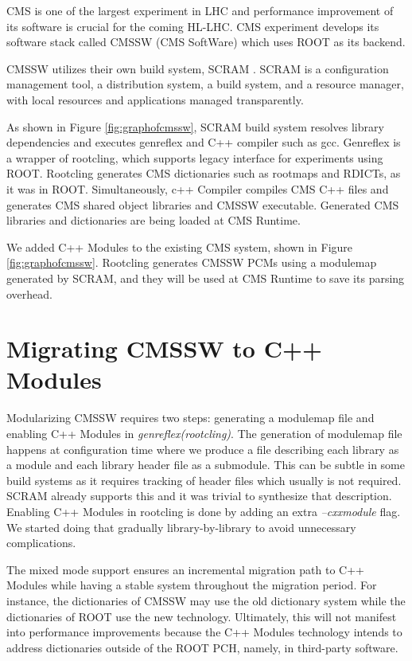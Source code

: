 \documentclass[12pt]{iopart}
\begin{document}
CMS \cite{cms} is one of the largest experiment in LHC and performance improvement of its software is crucial for the coming HL-LHC. CMS experiment develops its software stack called CMSSW (CMS SoftWare) which uses ROOT as its backend.

CMSSW utilizes their own build system, SCRAM \cite{scram}. SCRAM is a configuration management tool, a distribution system, a build system, and a resource manager, with local resources and applications managed transparently.

As shown in Figure \ref{fig:graphofcmssw}, SCRAM build system resolves library dependencies and executes genreflex and C++ compiler such as gcc. Genreflex is a wrapper of rootcling, which supports legacy interface for experiments using ROOT. Rootcling generates CMS dictionaries such as rootmaps and RDICTs, as it was in ROOT. Simultaneously, c++ Compiler compiles CMS C++ files and generates CMS shared object libraries and CMSSW executable. Generated CMS libraries and dictionaries are being loaded at CMS Runtime.

We added C++ Modules to the existing CMS system, shown in Figure \ref{fig:graphofcmssw}. Rootcling generates CMSSW PCMs using a modulemap generated by SCRAM, and they will be used at CMS Runtime to save its parsing overhead.

\section{Migrating CMSSW to C++ Modules}
\label{migration}
Modularizing CMSSW requires two steps: generating a modulemap file and enabling C++ Modules in \textit{genreflex(rootcling)}. The generation of modulemap file happens at configuration time where we produce a file describing each library as a module and each library header file as a submodule. This can be subtle in some build systems as it requires tracking of header files which usually is not required. SCRAM already supports this and it was trivial to synthesize that description. Enabling C++ Modules in rootcling is done by adding an extra \textit{--cxxmodule} flag. We started doing that gradually library-by-library to avoid unnecessary complications.

The mixed mode support ensures an incremental migration path to C++ Modules while having a stable system throughout the migration period. For instance, the dictionaries of CMSSW may use the old dictionary system while the dictionaries of ROOT use the new technology. Ultimately, this will not manifest into performance improvements because the C++ Modules technology intends to address dictionaries outside of the ROOT PCH, namely, in third-party software.
\end{document}

